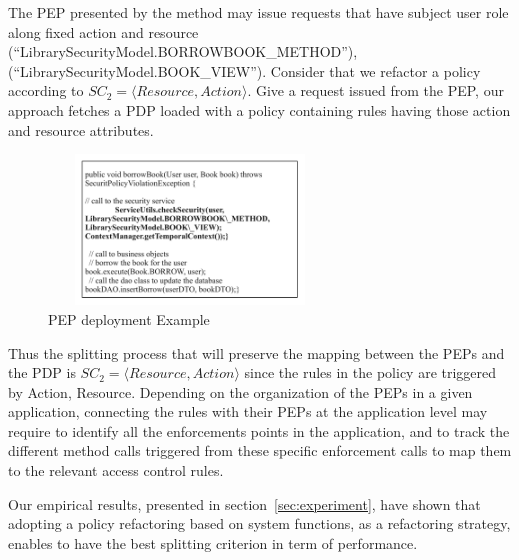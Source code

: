 

The PEP presented by the method  may issue requests that have subject user role along fixed action and 
resource (``LibrarySecurityModel.BORROWBOOK\_METHOD''), (``LibrarySecurityModel.BOOK\_VIEW'').
Consider that we refactor a policy according to $SC_{2}=\langle Resource,Action\rangle$.
Give a request issued from the PEP, our approach fetches a PDP loaded with a policy containing rules having those action and resource attributes.
\begin{figure}[!h]
\begin{center}
\includegraphics[width=7.5cm, height=4cm]{PEPExample}
\caption{PEP deployment Example}
\label{PEP deployment Example}
\end{center}
\end{figure}


Thus the splitting process that will preserve the mapping between the PEPs and the PDP is $SC_{2}=\langle Resource,Action\rangle$ since the rules in the policy are triggered 
by Action, Resource. Depending on the organization of the PEPs in a given application, connecting the rules with their PEPs at the application level may require to identify
 all the enforcements points in the application, and to track the different method calls triggered from these specific enforcement calls to map them to the relevant access
 control rules.

Our empirical results, presented in section~\ref{sec:experiment}, have shown that adopting a policy refactoring based on system functions, as a refactoring strategy, enables to 
have the best splitting criterion in term of performance. 
